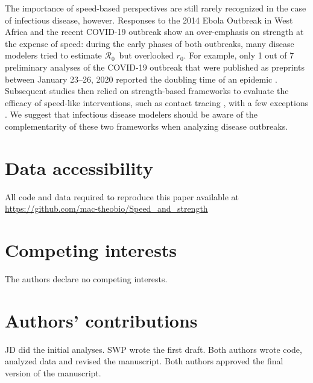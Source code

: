 \documentclass[12pt]{article}
\newcommand{\RR}{\ensuremath{{\mathcal R}}}
\newcommand{\Rx}[1]{\ensuremath{\RR_{\mathrm{#1}}}}
\newcommand{\Ro}{\Rx{0}}
\newcommand{\rr}{\ensuremath{{r}}}
\newcommand{\rx}[1]{\ensuremath{\rr_{\mathrm{#1}}}}
\newcommand{\ro}{\rx{0}}
\begin{document}
The importance of speed-based perspectives are still rarely recognized in the case of infectious disease, however. 
Responses to the 2014 Ebola Outbreak in West Africa and the recent COVID-19 outbreak show an over-emphasis on strength at the expense of speed:   
during the early phases of both outbreaks, many disease modelers tried to estimate \Ro\ but overlooked \ro.
For example, only 1 out of 7 preliminary analyses of the COVID-19 outbreak that were published as preprints between January 23--26, 2020 reported the doubling time of an epidemic \citep{bedfordncov, imaincov, liuncov, majumderncov, readncov, riouncov, zhaoncov}.
Subsequent studies then relied on strength-based frameworks to evaluate the efficacy of speed-like interventions, such as contact tracing \cite{hellewell2020feasibility,kretzschmar2020impact,kucharski2020contact}, with a few exceptions \cite{ferretti2020quantifying}.
We suggest that infectious disease modelers should be aware of the complementarity of these two frameworks when analyzing disease outbreaks.



\section*{Data accessibility}

All code and data required to reproduce this paper available at \url{https://github.com/mac-theobio/Speed_and_strength}

\section*{Competing interests}

The authors declare no competing interests.

\section*{Authors’ contributions}

JD did the initial analyses. SWP wrote the first draft. Both authors wrote code, analyzed data and revised the manuscript. Both authors approved the final version of the manuscript.
\end{document}
